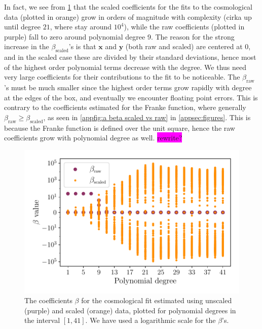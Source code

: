 \documentclass[aps,pra,english,notitlepage,reprint,nofootinbib]{revtex4-1}  %
\begin{document}
In fact, we see from \cref{fig:g beta scaled vs raw} that the scaled coefficients for the fits to the cosmological data (plotted in orange) grow in orders of magnitude with complexity (cirka up until degree $21$, where stay around $10^4$), while the raw coefficients (plotted in purple) fall to zero around polynomial degree 9. The reason for the strong increase in the $\beta_\text{scaled}$'s is that $\mathbf{x}$ and $\mathbf{y}$ (both raw and scaled) are centered at 0, and in the scaled case these are divided by their standard deviations, hence most of the highest order polynomial terms decrease with the degree. We thus need very large coefficients for their contributions to the fit to be noticeable. The $\beta_\text{raw}$'s must be much smaller since the highest order terms grow rapidly with degree at the edges of the box, and eventually we encounter floating point errors. This is contrary to the coefficients estimated for the Franke function, where generally $\beta_\text{raw}\geq\beta_\text{scaled}$, as seen in \cref{appfig:a beta scaled vs raw} in \cref{appsec:figures}. This is because the Franke function is defined over the unit square, hence the raw coefficients grow with polynomial degree as well. \colorbox{magenta}{rewrite?} 

\begin{figure}[h!]
  \vspace*{-5pt}
  \centering %
  \includegraphics[width=\columnwidth]{../figs/g_beta_scaled_vs_raw.pdf}
  \caption{The coefficients $\beta$ for the cosmological fit estimated using unscaled (purple) and scaled (orange) data, plotted for polynomial degrees in the interval $[1,41]$. We have used a logarithmic scale for the $\beta$'s.}\label{fig:g beta scaled vs raw}
  \vspace*{-5pt}
\end{figure}
\end{document}
